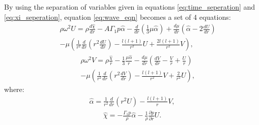 \documentclass[fleqn,usenatbib]{mnras}
\begin{document}
\hspace{\parindent}By using the separation of variables given in equations \ref{eq:time_seperation} and \ref{eq:xi_seperation}, equation \ref{eq:wave_eqn} becomes a set of 4 equations:%
\begin{align}\nonumber
&&\rho\omega^2U=\rho\frac{d\hat{\chi}}{dr}-A\Gamma_1 p\hat{\alpha}-\frac{d}{dr}\left(\frac{1}{3}\mu\hat{\alpha}\right)+\frac{d\mu}{dr}\left(\hat{\alpha}-2\frac{dU}{dr}\right)\\
&&-\mu\left(\frac{1}{r^2}\frac{d}{dr}\left( r^2\frac{dU}{dr}\right)-\frac{l(l+1)}{r^2}U+\frac{2l(l+1)}{r^2}V\right),
\label{eq:Ueqn}
\end{align}
\begin{align}\nonumber
&&\rho\omega^2V=\rho\frac{\hat{\chi}}{r}-\frac{1}{3}\frac{\mu\hat{\alpha}}{r}-\frac{d\mu}{dr}\left(\frac{dV}{dr}-\frac{V}{r}+\frac{U}{r}\right)\\
&&-\mu\left(\frac{1}{r^2}\frac{d}{dr}\left(r^2\frac{dV}{dr}\right)-\frac{l(l+1)}{r^2}V+\frac{2}{r^2}U\right),
\label{eq:Veqn}
\end{align}
\noindent where:
\begin{align}
\hat{\alpha}=\frac{1}{r^2}\frac{d}{dr}(r^2U)-\frac{l(l+1)}{r}V,
\label{eq:alphahat}
\end{align}
\begin{align}
\hat{\chi}=-\frac{\Gamma_1p}{\rho}\hat{\alpha}-\frac{1}{\rho}\frac{\partial p}{\partial r}U.
\label{eq:chihat}
\end{align}
\end{document}
